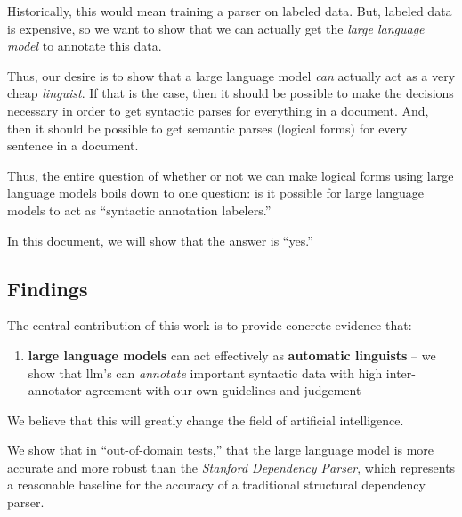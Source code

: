 Historically, this would mean training a parser on labeled data.
But, labeled data is expensive, so we want to show that we can actually get the {\em large language model} to annotate this data.

Thus, our desire is to show that a large language model {\em can} actually act as a very cheap {\em linguist}.
If that is the case, then it should be possible to make the decisions necessary in order to get syntactic parses for everything in a document.
And, then it should be possible to get semantic parses (logical forms) for every sentence in a document.

Thus, the entire question of whether or not we can make logical forms using large language models boils down to one question: is it possible for large language models to act as ``syntactic annotation labelers.''

In this document, we will show that the answer is ``yes.''

\subsection{Findings}
The central contribution of this work is to provide concrete evidence that:
\begin{enumerate}
    \item {\bf large language models} can act effectively as {\bf automatic linguists} -- we show that llm's can {\em annotate} important syntactic data with high inter-annotator agreement with our own guidelines and judgement
\end{enumerate}
We believe that this will greatly change the field of artificial intelligence.

We show that in ``out-of-domain tests,'' that the large language model is more accurate and more robust than the {\em Stanford Dependency Parser}, which represents a reasonable baseline for the accuracy of a traditional structural dependency parser.

